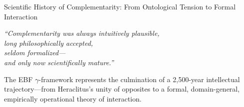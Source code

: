 \begin{chapter}{Scientific History of Complementarity: From Ontological Tension to Formal Interaction}
\begin{tcolorbox}[colback=blue!5!white,colframe=blue!75!black,title=\textbf{Concluding Historical Statement}]
\begin{center}
\large
\textit{``Complementarity was always intuitively plausible,\\
long philosophically accepted,\\
seldom formalized---\\
and only now scientifically mature.''}
\end{center}

\vspace{0.5em}
The EBF $\gamma$-framework represents the culmination of a 2,500-year intellectual trajectory---from Heraclitus's unity of opposites to a formal, domain-general, empirically operational theory of interaction.
\end{tcolorbox}

\end{chapter}
